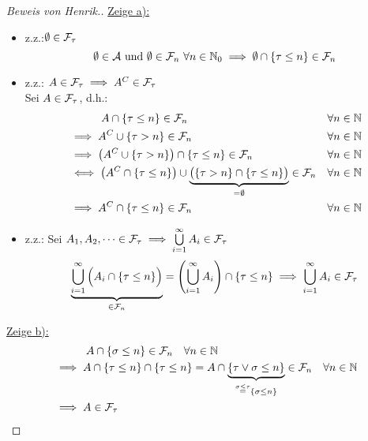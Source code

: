 \begin{proof}[Beweis von Henrik.]
	\underline{Zeige a):}\
	\begin{itemize} 
		\item z.z.:$\emptyset \in \mathcal{F}_\tau$
		\begin{equation*}
			\emptyset \in \mathcal{A} \text{ und } \emptyset \in \mathcal{F}_n\  \forall n \in \mathbb{N}_0 \implies \emptyset \cap \{\tau \leq n\} \in \mathcal{F}_n
		\end{equation*}
		\item z.z.: $A \in \mathcal{F}_\tau \implies A^C \in \mathcal{F}_\tau$\\
		Sei $A \in \mathcal{F}_\tau$, d.h.:
		\begin{align*}
			&{}\qquad \quad  A \cap \{\tau \leq n\} \in \mathcal{F}_n
			 &\forall n \in \mathbb{N}\\
			&\implies	A^C \cup \{\tau > n\} \in \mathcal{F}_n 
			 &\forall n \in \mathbb{N}\\
			&\implies 	\left(	A^C \cup \{\tau > n\}\right) \cap \{\tau \leq n\} \in \mathcal{F}_n
			 & \forall n \in \mathbb{N}\\
			& \iff \left(	A^C \cap \{\tau \leq n\}\right) \cup \underbrace{\big ( \{\tau > n\}\cap\{\tau \leq n\} \big )}_{= \emptyset} \in \mathcal{F}_n 
			 & \forall n \in \mathbb{N}\\
			&\implies A^C \cap \{\tau \leq n\} \in \mathcal{F}_n
			 & \forall n \in \mathbb{N}
		\end{align*}
	
		\item z.z.: Sei $A_1, A_2,\dots \in \mathcal{F}_\tau \implies \bigcup\limits_{i=1}^{\infty} A_i  \in \mathcal{F}_\tau$
		\begin{equation*}
			\underbrace{\bigcup\limits_{i=1}^{\infty} \Big (A_i \cap \{\tau \leq n\} \Big )}_{\in \mathcal{F}_n} = \left( \bigcup\limits_{i=1}^{\infty} A_i \right)\cap \{\tau \leq n\} \implies  \bigcup\limits_{i=1}^{\infty} A_i \in \mathcal{F}_\tau
		\end{equation*}
	\end{itemize}

	\underline{Zeige b):}
	\begin{align*}
		&{}\qquad \quad  A \cap \{\sigma \leq n\}  \in \mathcal{F}_n \quad \forall n \in \mathbb{N}\\
		&\implies A \cap \{\tau \leq n\} \cap \{\tau \leq n\} = A \cap \underbrace{ \{\tau \vee \sigma \leq n\}}_{ \overset{\sigma \leq \tau}{=} \{\sigma \leq n\} } \in \mathcal{F}_n \quad \forall n \in \mathbb{N}\\
		&\implies A \in \mathcal{F}_\tau \\
	\end{align*}


\end{proof}
